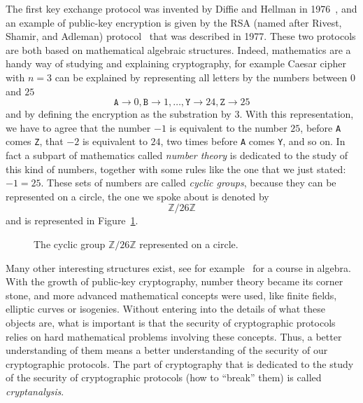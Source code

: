 The first key exchange protocol was invented by Diffie and Hellman in
1976~\cite{DH76}, and an example of public-key encryption is given by the RSA
(named after Rivest, Shamir, and Adleman) protocol~\cite{RSA78} that was
described in 1977. These two protocols are both based on mathematical algebraic
structures. Indeed, mathematics are a handy way of studying and explaining
cryptography, for example Caesar cipher with $n=3$ can be explained by
representing all letters by the numbers between $0$ and $25$
\[
  \texttt{A}\to 0, \texttt{B} \to 1, \dots,\texttt{Y}\to24, \texttt{Z}\to25
\]
and by defining the encryption as the substration by $3$. With this
representation, we have to agree that the number $-1$ is equivalent to the
number $25$, \ie before \texttt{A} comes \texttt{Z}, that $-2$ is equivalent to
$24$, \ie two times before \texttt{A} comes \texttt{Y}, and so on. In fact a
subpart of mathematics called \emph{number theory} is dedicated to the study of
this kind of numbers, together with some rules like the one that we just stated:
$-1=25$. These sets of numbers are called \emph{cyclic groups}, because they can
be represented on a circle, the one we spoke about is denoted by
\[
  \mathbb{Z}/26\mathbb{Z}
\]
and is represented in Figure~\ref{fig:cyclic-group}.
\begin{figure}[h]
  \centering
  \caption{The cyclic group $\mathbb{Z}/26\mathbb{Z}$ represented on a circle.}
  \label{fig:cyclic-group}
\end{figure}
Many other interesting structures exist, see for example~\cite{Lang04, Perrin96}
for a course in algebra. With the growth of public-key cryptography, number
theory became its corner stone, and more advanced mathematical concepts were
used, like finite fields, elliptic curves or isogenies. Without entering into
the details of what these objects are, what is important is that the security of
cryptographic protocols relies on hard mathematical problems involving these
concepts. Thus, a better understanding of them means a better understanding of
the security of our cryptographic protocols. The part of cryptography that is
dedicated to the study of the security of cryptographic protocols (\ie how to
``break'' them) is called \emph{cryptanalysis}.

